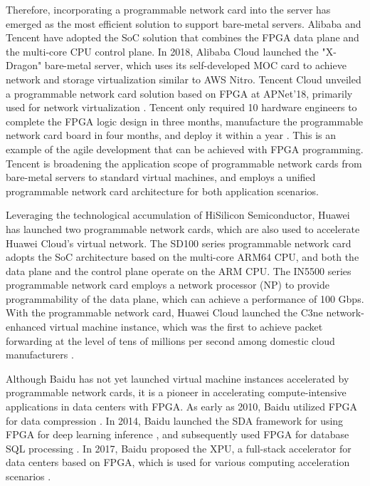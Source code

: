 Therefore, incorporating a programmable network card into the server has emerged as the most efficient solution to support bare-metal servers. Alibaba and Tencent have adopted the SoC solution that combines the FPGA data plane and the multi-core CPU control plane. In 2018, Alibaba Cloud launched the "X-Dragon" bare-metal server, which uses its self-developed MOC card \cite{alicloud-smartnic,alicloud-xdragon} to achieve network and storage virtualization similar to AWS Nitro. Tencent Cloud unveiled a programmable network card solution based on FPGA at APNet’18, primarily used for network virtualization \cite{tencent-smartnic}. Tencent only required 10 hardware engineers to complete the FPGA logic design in three months, manufacture the programmable network card board in four months, and deploy it within a year \cite{tencent-smartnic}. This is an example of the agile development that can be achieved with FPGA programming. Tencent is broadening the application scope of programmable network cards from bare-metal servers to standard virtual machines, and employs a unified programmable network card architecture for both application scenarios.

Leveraging the technological accumulation of HiSilicon Semiconductor, Huawei has launched two programmable network cards, which are also used to accelerate Huawei Cloud's virtual network. The SD100 series programmable network card \cite{sd100} adopts the SoC architecture based on the multi-core ARM64 CPU, and both the data plane and the control plane operate on the ARM CPU. The IN5500 series programmable network card \cite{in200} employs a network processor (NP) to provide programmability of the data plane, which can achieve a performance of 100 Gbps. With the programmable network card, Huawei Cloud launched the C3ne network-enhanced virtual machine instance, which was the first to achieve packet forwarding at the level of tens of millions per second among domestic cloud manufacturers \cite{huawei-smartnic}.

Although Baidu has not yet launched virtual machine instances accelerated by programmable network cards, it is a pioneer in accelerating compute-intensive applications in data centers with FPGA. As early as 2010, Baidu utilized FPGA for data compression \cite{ouyang2010fpga}. In 2014, Baidu launched the SDA framework for using FPGA for deep learning inference \cite{ouyang2014sda}, and subsequently used FPGA for database SQL processing \cite{baidu-fpga-sql}. In 2017, Baidu proposed the XPU, a full-stack accelerator for data centers based on FPGA, which is used for various computing acceleration scenarios \cite{ouyang2017xpu}.

